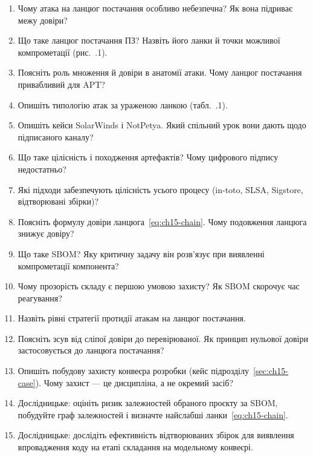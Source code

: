 \selfcheck
\begin{enumerate}
\item Чому атака на ланцюг постачання особливо небезпечна? Як вона підриває межу довіри?
\item Що таке ланцюг постачання ПЗ? Назвіть його ланки й точки можливої компрометації (рис.~\thechapter.1).
\item Поясніть роль множення й довіри в анатомії атаки. Чому ланцюг постачання привабливий для APT?
\item Опишіть типологію атак за ураженою ланкою (табл.~\thechapter.1).
\item Опишіть кейси SolarWinds і NotPetya. Який спільний урок вони дають щодо підписаного каналу?
\item Що таке цілісність і походження артефактів? Чому цифрового підпису недостатньо?
\item Які підходи забезпечують цілісність усього процесу (in-toto, SLSA, Sigstore, відтворювані збірки)?
\item Поясніть формулу довіри ланцюга~\eqref{eq:ch15-chain}. Чому подовження ланцюга знижує довіру?
\item Що таке SBOM? Яку критичну задачу він розв'язує при виявленні компрометації компонента?
\item Чому прозорість складу є першою умовою захисту? Як SBOM скорочує час реагування?
\item Назвіть рівні стратегії протидії атакам на ланцюг постачання.
\item Поясніть зсув від сліпої довіри до перевірюваної. Як принцип нульової довіри застосовується до ланцюга постачання?
\item Опишіть побудову захисту конвеєра розробки (кейс підрозділу~\ref{sec:ch15-case}). Чому захист --- це дисципліна, а не окремий засіб?
\item Дослідницьке: оцініть ризик залежностей обраного проєкту за SBOM, побудуйте граф залежностей і визначте найслабші ланки~\eqref{eq:ch15-chain}.
\item Дослідницьке: дослідіть ефективність відтворюваних збірок для виявлення впровадження коду на етапі складання на модельному конвеєрі.
\end{enumerate}
